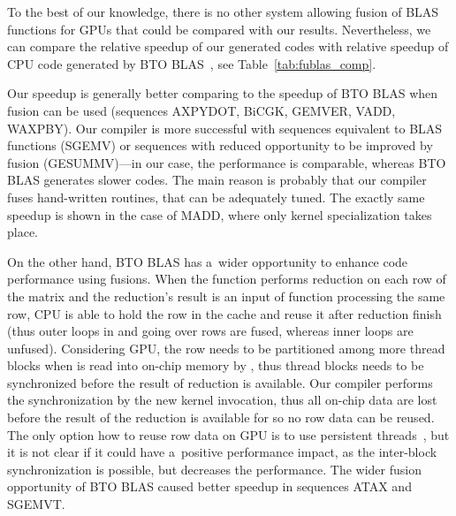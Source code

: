 \documentclass[final]{siamltex}
\begin{document}
{To the best of our knowledge, there is no other system allowing  fusion of BLAS functions for GPUs that could be compared with our results. Nevertheless, we can compare the relative speedup of our generated codes with relative speedup of CPU code generated by BTO BLAS~\cite{belter2009automating}, see Table~\ref{tab:fublas_comp}.

Our speedup is generally better comparing to the speedup of BTO BLAS when fusion can be used (sequences AXPYDOT, BiCGK, GEMVER, VADD, WAXPBY). Our compiler is more successful with sequences equivalent to BLAS functions (SGEMV) or sequences with reduced opportunity to be improved by fusion (GESUMMV)---in our case, the performance is comparable, whereas BTO BLAS generates slower codes. The main reason is probably that our compiler fuses hand-written routines, that can be adequately tuned. The exactly same speedup is shown in the case of MADD, where only kernel specialization takes place.

On the other hand, BTO BLAS has a~wider opportunity to enhance code performance using fusions. When the function  performs reduction on each row of the matrix and the reduction's result is an input of function  processing the same row, CPU is able to hold the row in the cache and reuse it after reduction finish (thus outer loops in  and  going over rows are fused, whereas inner loops are unfused). Considering GPU, the row needs to be partitioned among more thread blocks when is read into on-chip memory by , thus thread blocks needs to be synchronized before the result of reduction is available. Our compiler performs the synchronization by the new kernel invocation, thus all on-chip data are lost before the result of the reduction is available for  so no row data can be reused. The only option how to reuse row data on GPU is to use persistent threads~\cite{gupta2012study}, but it is not clear if it could have a~positive performance impact, as the inter-block synchronization is possible, but decreases the performance. The wider fusion opportunity of BTO BLAS caused better speedup in sequences ATAX and SGEMVT.

}
\end{document}
